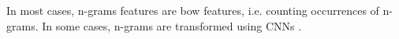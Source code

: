 In most cases, n-grams features are \ac{bow} features, i.e. counting occurrences of n-grams.
In some cases, n-grams are transformed using CNNs \cite{tyo_state_2022}.